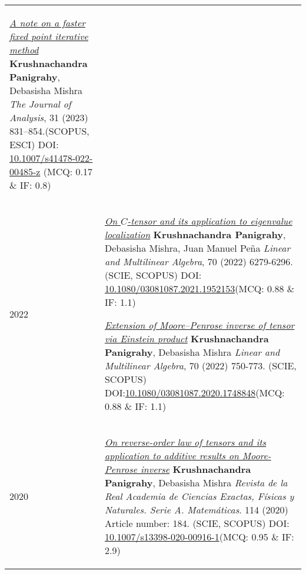 \documentclass[a4paper,12pt]{article}
\begin{document}
\begin{longtable}{lp{15cm}}
\begin{etaremune}[start=7]
\item \href{https://doi.org/10.1007/s41478-022-00485-z}{\it A note on a faster fixed point iterative method}\newline
{\footnotesize
{\bf Krushnachandra Panigrahy}, Debasisha Mishra \newline
{\it The Journal of Analysis}, 31 (2023) 831–854.\hfill{(SCOPUS, ESCI)}\newline
DOI: \href{https://doi.org/10.1007/s41478-022-00485-z}{10.1007/s41478-022-00485-z} \hfill(MCQ: 0.17 $\&$ IF: 0.8)
}
\end{etaremune}\\
\textsc{2022}&
\vspace{-0.5cm}
\begin{etaremune}[start=5]
\item \href{https://doi.org/10.1080/03081087.2021.1952153}{\it On $C$-tensor and its application to eigenvalue localization}\newline
{\footnotesize
{\bf Krushnachandra Panigrahy}, Debasisha Mishra, Juan Manuel Pe\~na\newline
{\it Linear and Multilinear Algebra}, 70 (2022) 6279-6296. \hfill{(SCIE, SCOPUS)}\newline
DOI: \href{https://doi.org/10.1080/03081087.2021.1952153}{10.1080/03081087.2021.1952153}\hfill(MCQ: 0.88 $\&$ IF: 1.1)
}
\item \href{https://doi.org/10.1080/03081087.2020.1748848}{\it Extension of Moore--Penrose inverse of tensor via Einstein product}\newline
{\footnotesize
{\bf Krushnachandra Panigrahy}, Debasisha Mishra\newline
{\it Linear and Multilinear Algebra}, 
70 (2022) 750-773. \hfill{(SCIE, SCOPUS)}
DOI:\href{https://doi.org/10.1080/03081087.2020.1748848}{10.1080/03081087.2020.1748848}\hfill(MCQ: 0.88 $\&$ IF: 1.1)
}
\end{etaremune}\\
\textsc{2020}&
\vspace{-0.5cm}
\begin{etaremune}
\item \href{https://doi.org/10.1007/s13398-020-00916-1}{\it On reverse-order law of tensors and its application to additive results on Moore-Penrose inverse}\newline
{\footnotesize{\bf Krushnachandra Panigrahy},  Debasisha Mishra\newline
{\it Revista de la Real Academia de Ciencias Exactas, F\'isicas y Naturales. Serie A. Matem\'aticas}. 114 (2020) Article number: 184. \hfill{(SCIE, SCOPUS)}\newline
DOI: \href{https://doi.org/10.1007/s13398-020-00916-1}{10.1007/s13398-020-00916-1}\hfill(MCQ: 0.95 $\&$ IF: 2.9)
}


\end{etaremune}
\end{longtable}
\end{document}

